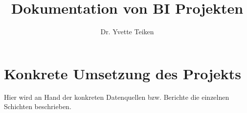 \documentclass[11pt,a4paper]{book} %
\title{Dokumentation von BI Projekten}
\author{Dr. Yvette Teiken}
\theoremstyle{break} %
\begin{document}
\maketitle              %



\tableofcontents
\cleardoublepage        %



\chapter{Konkrete Umsetzung des Projekts}
Hier wird an Hand der konkreten Datenquellen bzw. Berichte die einzelnen Schichten beschrieben.



%
%
%
%
%


%

%
%

%

%



%

%
%
%
%
%
%
%

%

%
\end{document}
